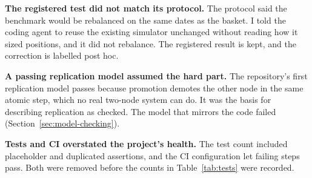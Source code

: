 \textbf{The registered test did not match its protocol.} The protocol said the benchmark would be rebalanced on the same dates as the basket. I told the coding agent to reuse the existing simulator unchanged without reading how it sized positions, and it did not rebalance. The registered result is kept, and the correction is labelled post hoc.

\textbf{A passing replication model assumed the hard part.} The repository's first replication model passes because promotion demotes the other node in the same atomic step, which no real two-node system can do. It was the basis for describing replication as checked. The model that mirrors the code failed (Section~\ref{sec:model-checking}).

\textbf{Tests and CI overstated the project's health.} The test count included placeholder and duplicated assertions, and the CI configuration let failing steps pass. Both were removed before the counts in Table~\ref{tab:tests} were recorded.
